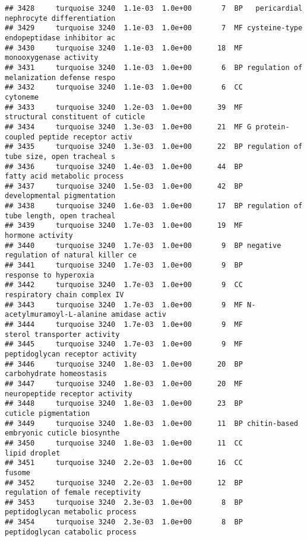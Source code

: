 \documentclass[]{article}
\begin{document}
\begin{verbatim}
## 3428     turquoise 3240  1.1e-03  1.0e+00       7  BP   pericardial nephrocyte differentiation
## 3429     turquoise 3240  1.1e-03  1.0e+00       7  MF cysteine-type endopeptidase inhibitor ac
## 3430     turquoise 3240  1.1e-03  1.0e+00      18  MF                   monooxygenase activity
## 3431     turquoise 3240  1.1e-03  1.0e+00       6  BP regulation of melanization defense respo
## 3432     turquoise 3240  1.1e-03  1.0e+00       6  CC                                 cytoneme
## 3433     turquoise 3240  1.2e-03  1.0e+00      39  MF        structural constituent of cuticle
## 3434     turquoise 3240  1.3e-03  1.0e+00      21  MF G protein-coupled peptide receptor activ
## 3435     turquoise 3240  1.3e-03  1.0e+00      22  BP regulation of tube size, open tracheal s
## 3436     turquoise 3240  1.4e-03  1.0e+00      44  BP             fatty acid metabolic process
## 3437     turquoise 3240  1.5e-03  1.0e+00      42  BP               developmental pigmentation
## 3438     turquoise 3240  1.6e-03  1.0e+00      17  BP regulation of tube length, open tracheal
## 3439     turquoise 3240  1.7e-03  1.0e+00      19  MF                         hormone activity
## 3440     turquoise 3240  1.7e-03  1.0e+00       9  BP negative regulation of natural killer ce
## 3441     turquoise 3240  1.7e-03  1.0e+00       9  BP                    response to hyperoxia
## 3442     turquoise 3240  1.7e-03  1.0e+00       9  CC             respiratory chain complex IV
## 3443     turquoise 3240  1.7e-03  1.0e+00       9  MF N-acetylmuramoyl-L-alanine amidase activ
## 3444     turquoise 3240  1.7e-03  1.0e+00       9  MF              sterol transporter activity
## 3445     turquoise 3240  1.7e-03  1.0e+00       9  MF          peptidoglycan receptor activity
## 3446     turquoise 3240  1.8e-03  1.0e+00      20  BP                 carbohydrate homeostasis
## 3447     turquoise 3240  1.8e-03  1.0e+00      20  MF           neuropeptide receptor activity
## 3448     turquoise 3240  1.8e-03  1.0e+00      23  BP                     cuticle pigmentation
## 3449     turquoise 3240  1.8e-03  1.0e+00      11  BP chitin-based embryonic cuticle biosynthe
## 3450     turquoise 3240  1.8e-03  1.0e+00      11  CC                            lipid droplet
## 3451     turquoise 3240  2.2e-03  1.0e+00      16  CC                                   fusome
## 3452     turquoise 3240  2.2e-03  1.0e+00      12  BP         regulation of female receptivity
## 3453     turquoise 3240  2.3e-03  1.0e+00       8  BP          peptidoglycan metabolic process
## 3454     turquoise 3240  2.3e-03  1.0e+00       8  BP          peptidoglycan catabolic process

\end{verbatim}
\end{document}
